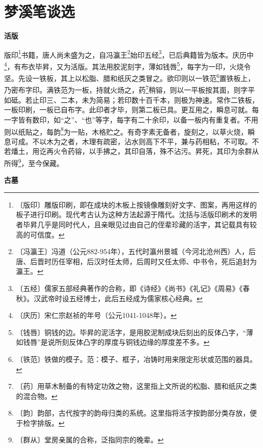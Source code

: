 \documentclass[12pt,UTF-8,openany,a4]{ctexbook}
\begin{document}
\chapter{梦溪笔谈选}

\begin{large}
    
    \begin{center}{\Large\textbf{活版}}\end{center}
    
    版印\footnote{〔版印〕\yiwen 雕版印刷，即在成块的木板上按镜像雕刻好文字、图案，再用这样的板子进行印刷。现代考古认为这种方法起源于隋代。沈括与活版印刷术的发明者毕昇几乎是同时代人，且亲眼见过由自己的侄辈珍藏的活字，其记载具有较高的可信度。}书籍，唐人尚未盛为之，自冯瀛王\footnote{〔冯瀛王〕\yiwen 冯道（公元882-954年），五代时瀛州景城（今河北沧州西）人，后唐、后晋时历任宰相，后汉时任太师，后周时又任太师、中书令，死后追封为瀛王。}始印五经\footnote{〔五经〕\yiwen 儒家五部经典著作的合称，即《诗经》《尚书》《礼记》《周易》《春秋》。汉武帝时设五经博士，此后五经成为儒家核心经典。}，已后典籍皆为版本。庆历中\footnote{〔庆历〕\yiwen 宋仁宗赵祯的年号（公元1041-1048年）。}，有布衣毕昇，又为活版。其法用胶泥刻字，薄如钱唇\footnote{〔钱唇〕\yiwen 铜钱的边。毕昇的泥活字，是用胶泥制成块后刻出的反体凸字，“薄如钱唇”是说所刻反体凸字的厚度与铜钱边缘的厚度差不多。}，每字为一印，火烧令坚。先设一铁板，其上以松脂、腊和纸灰之类冒之。欲印则以一铁范\footnote{〔铁范〕\yiwen 铁做的模子。范：模子、框子，冶铸时用来限定形状或范围的器具。}置铁板上，乃密布字印。满铁范为一板，持就火炀之，药\footnote{〔药〕\yiwen \yiwen 用草木制备的有特定功效之物，这里指上文所说的松脂、腊和纸灰之类的混合物。}稍镕，则以一平板按其面，则字平如砥。若止印三、二本，未为简易；若印数十百千本，则极为神速。常作二铁板，一板印刷，一板已自布字。此印者才毕，则第二板已具。更互用之，瞬息可就。每一字皆有数印，如“之”、“也”等字，每字有二十余印，以备一板内有重复者。不用则以纸贴之，每韵\footnote{〔韵〕\yiwen \yiwen 韵部，古代按字的韵母归类的系统。这里指将活字按韵部分类存放，便于检字排版。}为一贴，木格贮之。有奇字素无备者，旋刻之，以草火烧，瞬息可成。不以木为之者，木理有疏密，沾水则高下不平，兼与药相粘，不可取。不若燔土，用讫再火令药镕，以手拂之，其印自落，殊不沾污。昇死，其印为余群从所得\footnote{〔群从〕\yiwen 堂房亲属的合称，泛指同宗的晚辈。}，至今保藏。
    
    \begin{center}{\Large\textbf{古墓}}\end{center}
    

\end{large}
\end{document}
